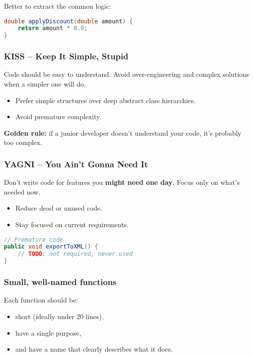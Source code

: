 \documentclass[a4paper,12pt]{article}
\begin{document}
Better to extract the common logic:

\begin{lstlisting}[language=Java]
double applyDiscount(double amount) {
    return amount * 0.9;
}
\end{lstlisting}

\subsubsection{KISS – Keep It Simple, Stupid}
Code should be easy to understand. Avoid over-engineering and complex solutions when a simpler one will do.

\begin{itemize}
  \item Prefer simple structures over deep abstract class hierarchies.
  \item Avoid premature complexity.
\end{itemize}

\textbf{Golden rule:} if a junior developer doesn’t understand your code, it’s probably too complex.

\subsubsection{YAGNI – You Ain’t Gonna Need It}
Don’t write code for features you \textbf{might need one day}. Focus only on what’s needed now.

\begin{itemize}
  \item Reduce dead or unused code.
  \item Stay focused on current requirements.
\end{itemize}

\begin{lstlisting}[language=Java]
// Premature code
public void exportToXML() {
    // TODO: not required, never used
}
\end{lstlisting}

\subsubsection{Small, well-named functions}
Each function should be:
\begin{itemize}
  \item short (ideally under 20 lines),
  \item have a single purpose,
  \item and have a name that clearly describes what it does.
\end{itemize}
\end{document}
